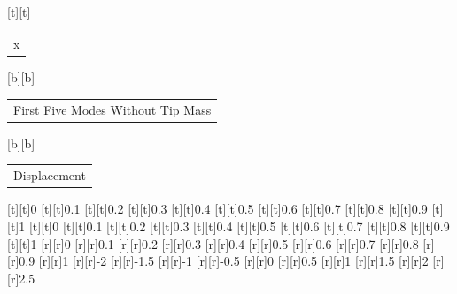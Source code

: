 %    
%
%
\begin{psfrags}%
\psfragscanon%
%
[t][t]{\color[rgb]{0,0,0}\setlength{\tabcolsep}{0pt}\begin{tabular}{c}x\end{tabular}}%
[b][b]{\color[rgb]{0,0,0}\setlength{\tabcolsep}{0pt}\begin{tabular}{c}First Five Modes Without Tip Mass\end{tabular}}%
[b][b]{\color[rgb]{0,0,0}\setlength{\tabcolsep}{0pt}\begin{tabular}{c}Displacement\end{tabular}}%
%
[t][t]{0}%
[t][t]{0.1}%
[t][t]{0.2}%
[t][t]{0.3}%
[t][t]{0.4}%
[t][t]{0.5}%
[t][t]{0.6}%
[t][t]{0.7}%
[t][t]{0.8}%
[t][t]{0.9}%
[t][t]{1}%
[t][t]{0}%
[t][t]{0.1}%
[t][t]{0.2}%
[t][t]{0.3}%
[t][t]{0.4}%
[t][t]{0.5}%
[t][t]{0.6}%
[t][t]{0.7}%
[t][t]{0.8}%
[t][t]{0.9}%
[t][t]{1}%
%
[r][r]{0}%
[r][r]{0.1}%
[r][r]{0.2}%
[r][r]{0.3}%
[r][r]{0.4}%
[r][r]{0.5}%
[r][r]{0.6}%
[r][r]{0.7}%
[r][r]{0.8}%
[r][r]{0.9}%
[r][r]{1}%
[r][r]{-2}%
[r][r]{-1.5}%
[r][r]{-1}%
[r][r]{-0.5}%
[r][r]{0}%
[r][r]{0.5}%
[r][r]{1}%
[r][r]{1.5}%
[r][r]{2}%
[r][r]{2.5}%
%
%
\end{psfrags}%
%
